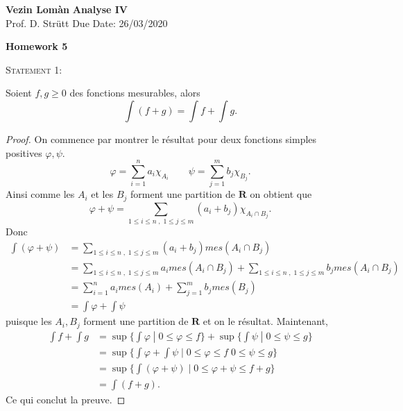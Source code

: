 \documentclass[12pt]{article}
\newenvironment{statement}[1]
{\begin{mdframed}[linewidth=0.6pt]
        \textsc{Statement #1:}

}
    {\end{mdframed}}
\begin{document}
\noindent \textbf{Vezin Lomàn} \hfill \textbf{Analyse IV}\\
\normalsize Prof. D. Strütt  \hfill Due Date: 26/03/2020\

\begin{center}
\textbf{Homework 5}
\end{center}

\begin{statement}{1}
	Soient $f,g \ge 0$ des fonctions mesurables, alors \[
		\int (f+g) = \int f + \int g
	.\] 
\end{statement}
\begin{proof}
	On commence par montrer le résultat pour deux fonctions simples positives $\varphi, \psi$.
	 \[
	\varphi = \sum_{i=1}^{n} a_{i}\chi_{A_{i}} \qquad \psi = \sum_{j=1}^{m} b_j \chi_{B_{j}}
.\] Ainsi comme les $A_{i}$ et les $B_{j}$ forment une partition de $\mathbf{R}$ on obtient que 
\[
	\varphi + \psi = \sum_{1\le i\le n \; , \; 1 \le j \le m} (a_{i} + b_{j})\chi_{A_{i} \cap B_{j}}
.\] 
Donc
\begin{align*}
	\int (\varphi + \psi) &= \sum_{1\le i\le n \; , \; 1 \le j \le m} (a_{i} + b_{j}) mes(A_i \cap B_j) \\
			      &= \sum_{1\le i\le n \; , \; 1 \le j \le m} a_{i} mes(A_i \cap B_j) + \sum_{1\le i\le n \; , \; 1 \le j \le m} b_j mes(A_i \cap B_j) \\
			      &= \sum_{i=1}^{n} a_i mes(A_i) + \sum_{j=1}^{m} b_j mes(B_j) \\
			      &= \int \varphi + \int \psi
\end{align*}
puisque les $A_{i}, B_{j}$ forment une partition de $\mathbf{R}$ et on le résultat.
Maintenant,
\begin{align*}
	\int f + \int g &= \sup \{\int \varphi \;|\; 0 \le \varphi \le f \} + \sup \{ \int \psi \;|\; 0 \le \psi \le g\} \\
		&= \sup \{\int \varphi + \int \psi \;|\; 0 \le \varphi \le f \; 0 \le \psi \le g \} \\
		&= \sup \{\int (\varphi + \psi) \;|\; 0 \le \varphi + \psi \le f + g\} \\
		&= \int (f+g)
.\end{align*}
Ce qui conclut la preuve.
\end{proof}
\end{document}
